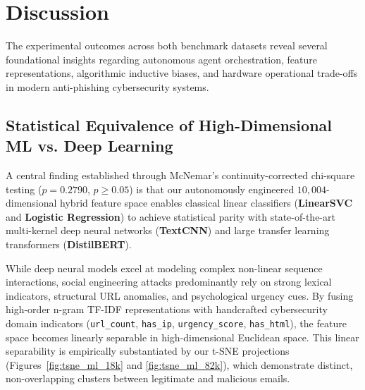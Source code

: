 \documentclass[conference]{IEEEtran}
\begin{document}
\FloatBarrier


\FloatBarrier

\section{Discussion}
\label{sec:discussion}

The experimental outcomes across both benchmark datasets reveal several foundational insights regarding autonomous agent orchestration, feature representations, algorithmic inductive biases, and hardware operational trade-offs in modern anti-phishing cybersecurity systems.

\subsection{Statistical Equivalence of High-Dimensional ML vs. Deep Learning}
A central finding established through McNemar's continuity-corrected chi-square testing ($p = 0.2790$, $p \ge 0.05$) is that our autonomously engineered $10,004$-dimensional hybrid feature space enables classical linear classifiers (\textbf{LinearSVC} and \textbf{Logistic Regression}) to achieve statistical parity with state-of-the-art multi-kernel deep neural networks (\textbf{TextCNN}) and large transfer learning transformers (\textbf{DistilBERT}). 

While deep neural models excel at modeling complex non-linear sequence interactions, social engineering attacks predominantly rely on strong lexical indicators, structural URL anomalies, and psychological urgency cues. By fusing high-order n-gram TF-IDF representations with handcrafted cybersecurity domain indicators (\texttt{url\_count}, \texttt{has\_ip}, \texttt{urgency\_score}, \texttt{has\_html}), the feature space becomes linearly separable in high-dimensional Euclidean space. This linear separability is empirically substantiated by our t-SNE projections (Figures~\ref{fig:tsne_ml_18k} and \ref{fig:tsne_ml_82k}), which demonstrate distinct, non-overlapping clusters between legitimate and malicious emails.
\end{document}
